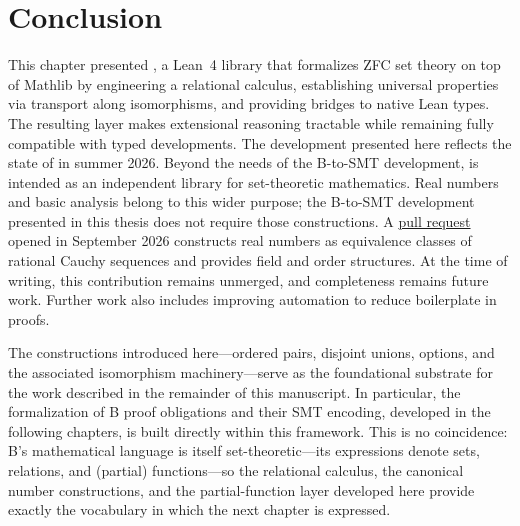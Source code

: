 \ifThesisAfive\else{}\fi
\section{Conclusion}
\label{sec:zflean-conclusion}

This chapter presented \zflean, a Lean~4 library that formalizes ZFC set theory on top of Mathlib by engineering a relational calculus, establishing universal properties via transport along isomorphisms, and providing bridges to native Lean types.
The resulting layer makes extensional reasoning tractable while remaining fully compatible with typed developments.
The development presented here reflects the state of \zflean in summer 2026.
Beyond the needs of the B-to-SMT development, \zflean is intended as an independent library for set-theoretic mathematics.
Real numbers and basic analysis belong to this wider purpose; the B-to-SMT development presented in this thesis does not require those constructions.
A \href{https://github.com/VTrelat/ZFLean/pull/11}{pull request} opened in September 2026 constructs real numbers as equivalence classes of rational Cauchy sequences and provides field and order structures. At the time of writing, this contribution remains unmerged, and completeness remains future work.
Further work also includes improving automation to reduce boilerplate in proofs.

The constructions introduced here---ordered pairs, disjoint unions, options, and the associated isomorphism machinery---serve as the foundational substrate for the work described in the remainder of this manuscript.
In particular, the formalization of B proof obligations and their SMT encoding, developed in the following chapters, is built directly within this framework.
This is no coincidence: B's mathematical language is itself set-theoretic---its expressions denote sets, relations, and (partial) functions---so the relational calculus, the canonical number constructions, and the partial-function layer developed here provide exactly the vocabulary in which the next chapter is expressed.
